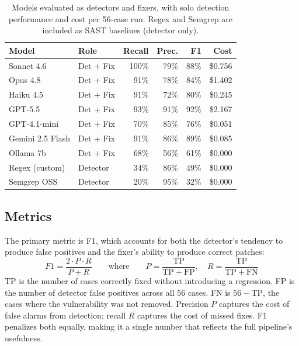 \documentclass[12pt]{article}
\begin{document}
\begin{table}[H]
  \centering
  \caption{Models evaluated as detectors and fixers, with solo detection
  performance and cost per 56-case run. Regex and Semgrep are included as
  SAST baselines (detector only).}
  \label{tab:models}
  \begin{tabular}{llrrrr}
    \toprule
    Model & Role & Recall & Prec. & F1 & Cost \\
    \midrule
    Sonnet 4.6      & Det + Fix & 100\% & 79\% & 88\% & \$0.756 \\
    Opus 4.8        & Det + Fix &  91\% & 78\% & 84\% & \$1.402 \\
    Haiku 4.5       & Det + Fix &  91\% & 72\% & 80\% & \$0.245 \\
    GPT-5.5         & Det + Fix &  93\% & 91\% & 92\% & \$2.167 \\
    GPT-4.1-mini    & Det + Fix &  70\% & 85\% & 76\% & \$0.051 \\
    Gemini 2.5 Flash& Det + Fix &  91\% & 86\% & 89\% & \$0.085 \\
    Ollama 7b       & Det + Fix &  68\% & 56\% & 61\% & \$0.000 \\
    \midrule
    Regex (custom)  & Detector  &  34\% & 86\% & 49\% & \$0.000 \\
    Semgrep OSS     & Detector  &  20\% & 95\% & 32\% & \$0.000 \\
    \bottomrule
  \end{tabular}
\end{table}

\subsection{Metrics}

The primary metric is F1, which accounts for both the detector's tendency to
produce false positives and the fixer's ability to produce correct patches:
\[
  F1 = \frac{2 \cdot P \cdot R}{P + R}
  \qquad \text{where} \qquad
  P = \frac{\mathrm{TP}}{\mathrm{TP} + \mathrm{FP}}, \quad
  R = \frac{\mathrm{TP}}{\mathrm{TP} + \mathrm{FN}}
\]
TP is the number of cases correctly fixed without introducing a regression.
FP is the number of detector false positives across all 56 cases. FN is
$56 - \mathrm{TP}$, the cases where the vulnerability was not removed.
Precision $P$ captures the cost of false alarms from detection; recall $R$
captures the cost of missed fixes. F1 penalizes both equally, making it a
single number that reflects the full pipeline's usefulness.
\end{document}

